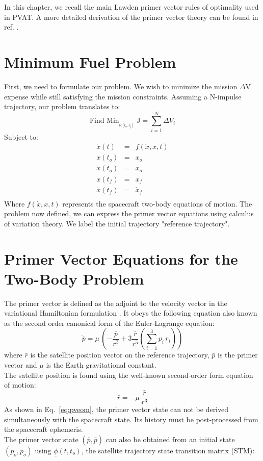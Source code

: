 \documentclass[12pt]{report}
\begin{document}
In this chapter, we recall the main Lawden primer vector rules of
optimality used in PVAT. A more detailed derivation of the primer
vector theory can be found in ref. \cite{Schiff01}.

\section{Minimum Fuel Problem}
First, we need to formulate our problem. We wish to minimize the
mission $\Delta$V expense while still satisfying the mission
constraints. Assuming a N-impulse trajectory, our problem
translates to:
\begin{equation}
\mbox{Find  Min$_{_{t \epsilon [t_{o},t_{f}]}}$ J}= \sum_{i=1}^{N}
\Delta V_{i} \label{eq:mainprob}
\end{equation}
Subject to:
\begin{eqnarray*}
\dot{x}(t)       & = & f(\dot{x},x,t)  \\
x(t_{o})      & = &  x_{o} \\
\dot{x}(t_{o})& = & \dot{x}_{o} \\
x(t_{f})      & = &  x_{f} \\
\dot{x}(t_{f})& = & \dot{x}_{f} \\
\end{eqnarray*}
\noindent Where $f(\dot{x},x,t)$ represents the spacecraft
two-body equations of motion. The problem now defined, we can
express the primer vector equations using calculus of variation
theory. We label the initial trajectory "reference trajectory".

\section{Primer Vector Equations for the Two-Body Problem}

The primer vector is defined as the adjoint to the velocity vector
in the variational Hamiltonian formulation
\cite{Lawden63,Schiff01,Hiday92}.  It obeys the following equation
also known as the second order canonical form of the Euler-Lagrange equation:\\
\begin{equation}
\ddot{\bar{p}} = \mu\,(-\frac{\bar{p}}{r^{3}} + 3
\frac{\bar{r}}{r^{5}}(\sum_{i=1}^{3} p_{i}\,r_{i}))
\label{eq:pveom}
\end{equation}
\noindent where $\bar r$ is the satellite position vector on the
reference trajectory, $\bar p$ is the primer vector and $\mu$ is
the Earth gravitational constant.\\
The satellite position is found using the well-known second-order
form equation of motion:
\begin{equation}
\ddot{\bar{r}} = -\mu\,\frac{\bar{r}}{r^{3}}
\end{equation}
As shown in Eq.~\ref{eq:pveom}, the primer vector state can not be
derived simultaneously with the spacecraft state. Its history must
be post-processed from the spacecraft ephemeris.\\
\noindent The primer vector state $(\bar p, \dot{\bar p})$ can
also be obtained from an initial state $(\bar p_{o}, \dot{\bar
p_{o}})$ using $\underline{\phi}(t,t_{o})$, the satellite
trajectory state transition matrix (STM):\\
\end{document}
